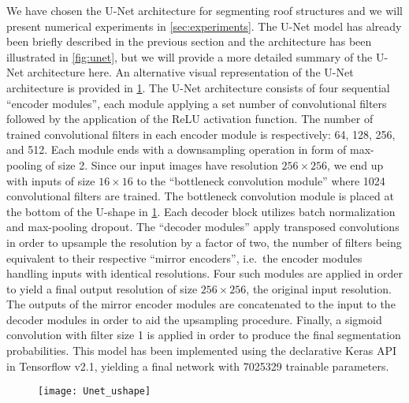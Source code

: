 We have chosen the U-Net architecture for segmenting roof structures and we will present numerical experiments in \cref{sec:experiments}.
The U-Net model has already been briefly described in the previous section and the architecture has been illustrated in \cref{fig:unet}, but we will provide a more detailed summary of the U-Net architecture here.
An alternative visual representation of the U-Net architecture is provided in \cref{fig:unet2}.
The U-Net architecture consists of four sequential \enquote{encoder modules}, each module applying a set number of convolutional filters followed by the application of the ReLU activation function.
The number of trained convolutional filters in each encoder module is respectively: 64, 128, 256, and 512.
Each module ends with a downsampling operation in form of max-pooling of size 2.
Since our input images have resolution $256 \times 256$, we end up with inputs of size $16 \times 16$ to the \enquote{bottleneck convolution module} where 1024 convolutional filters are trained.
The bottleneck convolution module is placed at the bottom of the U-shape in \cref{fig:unet2}.
Each decoder block utilizes batch normalization and max-pooling dropout.
The \enquote{decoder modules} apply transposed convolutions in order to upsample the resolution by a factor of two, the number of filters being equivalent to their respective \enquote{mirror encoders}, i.e.\ the encoder modules handling inputs with identical resolutions.
Four such modules are applied in order to yield a final output resolution of size $256 \times 256$, the original input resolution.
The outputs of the mirror encoder modules are concatenated to the input to the decoder modules in order to aid the upsampling procedure.
Finally, a sigmoid convolution with filter size \num{1} is applied in order to produce the final segmentation probabilities.
This model has been implemented using the declarative Keras API in Tensorflow v2.1, yielding a final network with \num{7025329} trainable parameters.

\begin{figure}
  \centering
  \texttt{[image: Unet\_ushape]}
  \label{fig:unet2}
\end{figure}
